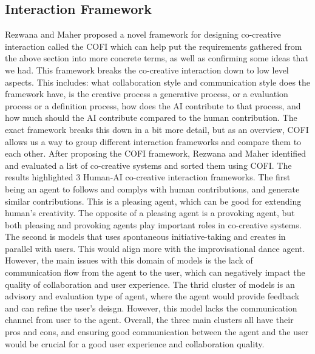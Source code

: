\documentclass[final,5p,times,twocolumn,authoryear]{article}
\begin{document}
\subsection{Interaction Framework}
Rezwana and Maher proposed a novel framework for designing co-creative
interaction called the COFI which can help put the requirements gathered
from the above section into more concrete terms, as well as confirming
some ideas that we had. This framework breaks the co-creative
interaction down to low level aspects. This includes: what collaboration style
and communication style does the framework have, is the creative process
a generative process, or a evaluation process or a definition process, how does the AI
contribute to that process, and how much should the AI contribute
compared to the human contribution. The exact framework breaks this down
in a bit more detail, but as an overview, COFI allows us a way to group
different interaction frameworks and compare them to each other. After
proposing the COFI framework, Rezwana and Maher identified and evaluated
a list of co-creative systems and sorted them using COFI. The results
highlighted 3 Human-AI co-creative interaction frameworks. The first
being an agent to follows and complys with human contributions, and
generate similar contributions. This is a pleasing agent, which can be
good for extending human's creativity. The opposite of a pleasing agent
is a provoking agent, but both pleasing and provoking agents play
important roles in co-creative systems. The second is models that uses
spontaneous initiative-taking and creates in parallel with users. This
would align more with the improvisational dance agent. However, the main
issues with this domain of models is the lack of communication flow from
the agent to the user, which can negatively impact the quality of
collaboration and user experience. The thrid cluster of models is an
advisory and evaluation type of agent, where the agent would provide
feedback and can refine the user's deisgn. However, this model lacks the
communication channel from user to the agent. Overall, the three main
clusters all have their pros and cons, and ensuring good communication
between the agent and the user would be crucial for a good user
experience and collaboration quality.
\end{document}
